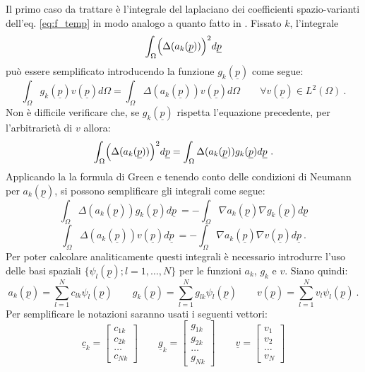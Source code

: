 \documentclass[a4paper,11pt,twoside,openright]{book}							%
\begin{document}
Il primo caso da trattare è l'integrale del laplaciano dei coefficienti spazio-varianti dell'eq. \ref{eq:f_temp} in modo analogo a quanto fatto in \cite{art:sangalli}. Fissato $k$, l'integrale
$$
\int_{\Omega} \Bigl( \Delta(  a_k(\underline p)  ) \Bigr)^2 d \underline p
$$
può essere semplificato introducendo la funzione $g_k(\underline p)$ come segue:
\begin{equation}
\label{eq:ps1}
\int_\Omega g_k(\underline{p}) v(\underline{p}) d \Omega= \int_\Omega \Delta (a_k(\underline p)) v(\underline p) d \Omega\qquad \forall v(\underline{p}) \in L^2(\Omega) \ .
\end{equation}
Non è difficile verificare che, se $g_k(\underline p)$ rispetta l'equazione precedente, per l'arbitrarietà di $v$ allora:
\begin{equation}
\label{eq:ps2}
\int_{\Omega} \Bigl( \Delta(  a_k(\underline p)  ) \Bigr)^2 d \underline p = \int_{\Omega}  \Delta(  a_k(\underline p))g_k(\underline p)d \underline p \ .
\end{equation}
Applicando la la formula di Green e tenendo conto delle condizioni di Neumann per $a_k(\underline p)$, si possono semplificare gli integrali come segue:
$$
\int_{\Omega}  \Delta(  a_k(\underline p))g_k(\underline p)d \underline p \ = -\int_{\Omega} \nabla  a_k(\underline p)\nabla g_k(\underline p)d \underline p
$$
$$
\int_{\Omega}  \Delta(  a_k(\underline p))v(\underline p)d \underline p \ = -\int_{\Omega} \nabla  a_k(\underline p)\nabla v(\underline p)d \underline p \ .
$$
Per poter calcolare analiticamente questi integrali è necessario introdurre l'uso delle basi spaziali $\{ \psi_l(\underline p);l=1, \ldots , N \}$ per le funzioni $a_k$, $g_k$ e $v$. Siano quindi:
$$
a_k(\underline p)=\sum_{l=1}^N c_{lk}\psi_l(\underline p) \qquad 
g_k(\underline p)=\sum_{l=1}^N g_{lk}\psi_l(\underline p) \qquad
v(\underline p)=\sum_{l=1}^N v_{l}\psi_l(\underline p) \ .
$$
Per semplificare le notazioni saranno usati i seguenti vettori:
$$
\underline c_k =
\begin{bmatrix}
c_{1k} \\ c_{2k} \\ \hdots \\ c_{Nk}
\end{bmatrix}
\qquad
\underline g_k =
\begin{bmatrix}
g_{1k} \\ g_{2k} \\ \hdots \\ g_{Nk}
\end{bmatrix}
\qquad
\underline v =
\begin{bmatrix}
v_1 \\ v_2 \\ \hdots \\ v_N
\end{bmatrix} 
$$
\end{document}
